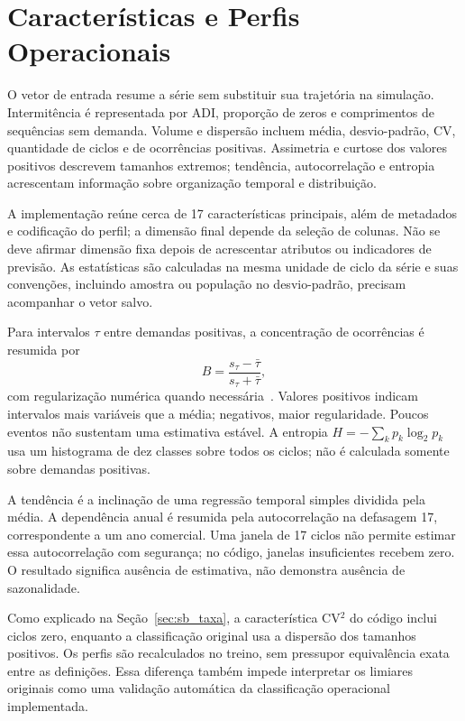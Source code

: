 \section{Características e Perfis Operacionais}
\label{sec:carac_series}

O vetor de entrada resume a série sem substituir sua trajetória na simulação. Intermitência é representada por ADI, proporção de zeros e comprimentos de sequências sem demanda. Volume e dispersão incluem média, desvio-padrão, CV, quantidade de ciclos e de ocorrências positivas. Assimetria e curtose dos valores positivos descrevem tamanhos extremos; tendência, autocorrelação e entropia acrescentam informação sobre organização temporal e distribuição.

A implementação reúne cerca de 17 características principais, além de metadados e codificação do perfil; a dimensão final depende da seleção de colunas. Não se deve afirmar dimensão fixa depois de acrescentar atributos ou indicadores de previsão. As estatísticas são calculadas na mesma unidade de ciclo da série e suas convenções, incluindo amostra ou população no desvio-padrão, precisam acompanhar o vetor salvo.

Para intervalos $\tau$ entre demandas positivas, a concentração de ocorrências é resumida por
\[
B=\frac{s_\tau-\bar\tau}{s_\tau+\bar\tau},
\]
com regularização numérica quando necessária~\citep{GohBarabasi2008Burstiness}. Valores positivos indicam intervalos mais variáveis que a média; negativos, maior regularidade. Poucos eventos não sustentam uma estimativa estável. A entropia $H=-\sum_kp_k\log_2p_k$ usa um histograma de dez classes sobre todos os ciclos; não é calculada somente sobre demandas positivas.

A tendência é a inclinação de uma regressão temporal simples dividida pela média. A dependência anual é resumida pela autocorrelação na defasagem 17, correspondente a um ano comercial. Uma janela de 17 ciclos não permite estimar essa autocorrelação com segurança; no código, janelas insuficientes recebem zero. O resultado significa ausência de estimativa, não demonstra ausência de sazonalidade.

Como explicado na Seção~\ref{sec:sb_taxa}, a característica CV$^2$ do código inclui ciclos zero, enquanto a classificação original usa a dispersão dos tamanhos positivos. Os perfis são recalculados no treino, sem pressupor equivalência exata entre as definições. Essa diferença também impede interpretar os limiares originais como uma validação automática da classificação operacional implementada.

